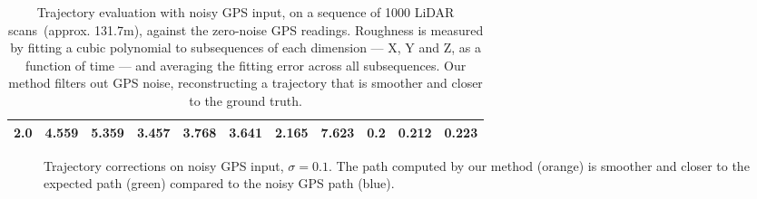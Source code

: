 \begin{table}[h!]
{\begin{tabular}{c|ccccc|ccccc}
            2.0                     & 4.559                                         & 5.359                                   & 3.457                                & 3.768                                  & 3.641          & 2.165          & 7.623          & 0.2            & 0.212          & 0.223          \\
            \hline
        \end{tabular}
    }
    \caption[Trajectory evaluation with noisy GPS]{Trajectory evaluation with noisy GPS input, on a sequence of 1000 LiDAR scans~(approx. 131.7m), against the zero-noise GPS readings. Roughness is measured by fitting a cubic polynomial to subsequences of each dimension --- X, Y and Z, as a function of time --- and averaging the fitting error across all subsequences. Our method filters out GPS noise, reconstructing a trajectory that is smoother and closer to the ground truth.}
    \label{tab:gps-noisy}
\end{table}
\begin{figure}[h]
    \centering
    \caption[Trajectory corrections over noisy GPS]{Trajectory corrections on noisy GPS input, $\sigma = 0.1$. The path computed by our method (orange) is smoother and closer to the expected path (green) compared to the noisy GPS path (blue).}
    \label{fig:gps-noise-correction}
\end{figure}




